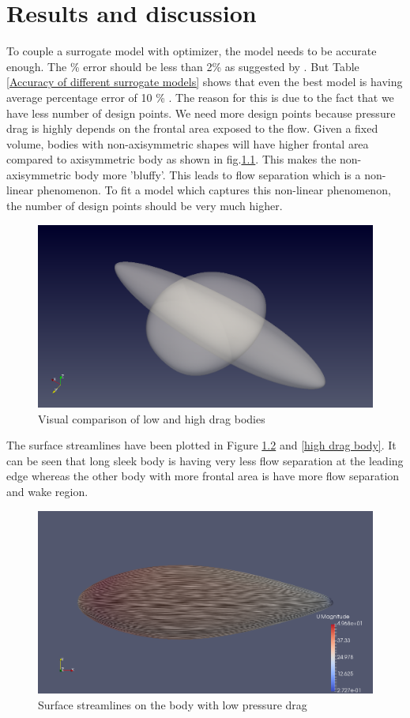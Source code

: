 \chapter{Results and discussion}
To couple a surrogate model with optimizer, the model needs to be accurate enough. The \% error should be less than 2\% as suggested by \cite{alam2017thesis}. But Table \ref{Accuracy of different surrogate models} shows that even the best model is having average percentage error of 10 \% . The reason for this is due to the fact that we have less number of design points. We need more design points because pressure drag is highly depends on the frontal area exposed to the flow. Given a fixed volume, bodies with non-axisymmetric shapes will have higher frontal area compared to axisymmetric body as shown in fig.\ref{visual comparison}. This makes the non-axisymmetric body more 'bluffy'. This leads to flow separation which is a non-linear phenomenon. To fit a model which captures this non-linear phenomenon, the number of design points should be very much higher. 

\begin{figure}[H]
	\centering
	\includegraphics[width=300 pt]{rnd/visual_low_high.png}
	\caption{Visual comparison of low and high drag bodies}
	\label{visual comparison} %
\end{figure}

The surface streamlines have been plotted in Figure \ref{low drag body} and \ref{high drag body}. It can be seen that long sleek body is having very less flow separation at the leading edge whereas the other body with more frontal area is have more flow separation and wake region.

\begin{figure}[H]
	\centering
	\includegraphics[width=300 pt]{rnd/streamlines_25_l.png}
	\caption{Surface streamlines on the body with low pressure drag}
	\label{low drag body} %
\end{figure}

